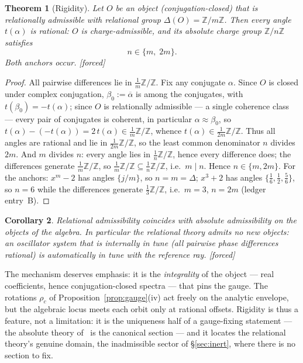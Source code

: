\documentclass[11pt]{article}
\theoremstyle{plain}
\newtheorem{theorem}{Theorem}[section]
\newtheorem{corollary}[theorem]{Corollary}
\theoremstyle{definition}
\theoremstyle{remark}
\newcommand{\Z}{\mathbb{Z}}
\newcommand{\F}{\textnormal{[forced]}}
\begin{document}
\begin{theorem}[Rigidity]\label{thm:rigidity}
Let $O$ be an object (conjugation-closed) that is relationally admissible with
relational group $\Delta(O)=\Z/m\Z$. Then every angle $t(\alpha)$ is rational:
$O$ is charge-admissible, and its absolute charge group $\Z/n\Z$ satisfies
\[
n\in\{m,\;2m\}.
\]
Both anchors occur. \F
\end{theorem}

\begin{proof}
All pairwise differences lie in $\frac1m\Z/\Z$. Fix any conjugate $\alpha$.
Since $O$ is closed under complex conjugation, $\beta_0:=\overline{\alpha}$
is among the conjugates, with $t(\beta_0)=-t(\alpha)$; since $O$ is relationally admissible --- a single coherence class ---
every pair of conjugates is coherent, in particular $\alpha\approx\beta_0$, so
$t(\alpha)-(-t(\alpha))=2\,t(\alpha)\in\frac1m\Z/\Z$, whence
$t(\alpha)\in\frac{1}{2m}\Z/\Z$. Thus all angles are rational and lie in
$\frac{1}{2m}\Z/\Z$, so the least common denominator $n$ divides $2m$. And $m$ divides $n$:
every angle lies in $\frac1n\Z/\Z$, hence every difference does; the
differences generate $\frac1m\Z/\Z$, so
$\frac1m\Z/\Z\subseteq\frac1n\Z/\Z$, i.e.\ $m\mid n$. Hence
$n\in\{m,2m\}$. For the anchors:
$x^m-2$ has angles $\{j/m\}$, so $n=m=\Delta$; $x^3+2$ has angles
$\{\tfrac16,\tfrac12,\tfrac56\}$, so $n=6$ while the differences generate
$\tfrac13\Z/\Z$, i.e.\ $m=3$, $n=2m$ (ledger entry~B).
\end{proof}

\begin{corollary}\label{cor:nonew}
Relational admissibility coincides with absolute admissibility on the objects of
the algebra. In particular the relational theory admits no new objects: an
oscillator system that is internally in tune (all pairwise phase differences
rational) is automatically in tune with the reference ray. \F
\end{corollary}

The mechanism deserves emphasis: it is the \emph{integrality} of the object ---
real coefficients, hence conjugation-closed spectra --- that pins the gauge. The
rotations $\rho_c$ of Proposition~\ref{prop:gauge}(iv) act freely on the analytic
envelope, but the algebraic locus meets each orbit only at rational offsets.
Rigidity is thus a feature, not a limitation: it is the uniqueness half of a
gauge-fixing statement --- the absolute theory of~\cite{CMC} is the canonical
section --- and it locates the relational theory's genuine domain, the
inadmissible sector of \S\ref{sec:inert}, where there is no section to fix.
\end{document}

